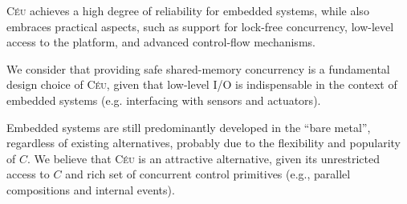 \documentclass[preprint]{sigplanconf}
\newcommand{\CEU}{\textsc{C\'{e}u}\xspace}
\newcommand{\1}{\;}
\newcommand{\2}{\;\;}
\newcommand{\3}{\;\;\;}
\newcommand{\5}{\;\;\;\;\;}
\begin{document}
\CEU achieves a high degree of reliability for embedded systems, while also 
embraces practical aspects, such as support for lock-free concurrency, 
low-level access to the platform, and advanced control-flow mechanisms.

We consider that providing safe shared-memory concurrency is a fundamental 
design choice of \CEU, given that low-level I/O is indispensable in the context 
of embedded systems (e.g. interfacing with sensors and actuators).

Embedded systems are still predominantly developed in the ``bare metal'', 
regardless of existing alternatives, probably due to the flexibility and 
popularity of $C$.
We believe that \CEU is an attractive alternative, given its unrestricted 
access to $C$ and rich set of concurrent control primitives (e.g., parallel 
compositions and internal events).

\end{document}
